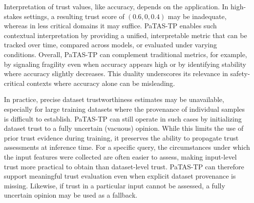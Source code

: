 Interpretation of trust values, like accuracy, depends on the application. In high-stakes settings, a resulting trust score of \((0.6, 0, 0.4)\) may be inadequate, whereas in less critical domains it may suffice. \ac{PaTAS-TP} enables such contextual interpretation by providing a unified, interpretable metric that can be tracked over time, compared across models, or evaluated under varying conditions. Overall, \ac{PaTAS-TP} can complement traditional metrics, for example, by signaling fragility even when accuracy appears high or by identifying stability where accuracy slightly decreases. This duality underscores its relevance in safety-critical contexts where accuracy alone can be misleading.

In practice, precise dataset trustworthiness estimates may be unavailable, especially for large training datasets where the provenance of individual samples is difficult to establish. \ac{PaTAS-TP} can still operate in such cases by initializing dataset trust to a fully uncertain (vacuous) opinion. While this limits the use of prior trust evidence during training, it preserves the ability to propagate trust assessments at inference time. For a specific query, the circumstances under which the input features were collected are often easier to assess, making input-level trust more practical to obtain than dataset-level trust. \ac{PaTAS-TP} can therefore support meaningful trust evaluation even when explicit dataset provenance is missing. Likewise, if trust in a particular input cannot be assessed, a fully uncertain opinion may be used as a fallback.

